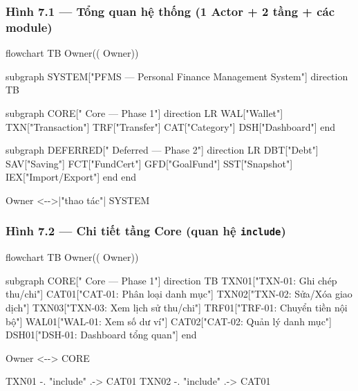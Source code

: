 \documentclass[11pt,a4paper]{article}
\newenvironment{Shaded}{}{}
\newcommand{\NormalTok}[1]{#1}
\begin{document}
\subsubsection{Hình 7.1 --- Tổng quan hệ thống (1 Actor + 2 tầng + các module)}\label{huxecnh-7.1-tux1ed5ng-quan-hux1ec7-thux1ed1ng-1-actor-2-tux1ea7ng-cuxe1c-module}

\begin{Shaded}
\begin{Highlighting}[]
\NormalTok{flowchart TB}
\NormalTok{    Owner(( Owner))}

\NormalTok{    subgraph SYSTEM["PFMS — Personal Finance Management System"]}
\NormalTok{        direction TB}

\NormalTok{        subgraph CORE[" Core — Phase 1"]}
\NormalTok{            direction LR}
\NormalTok{            WAL["Wallet"]}
\NormalTok{            TXN["Transaction"]}
\NormalTok{            TRF["Transfer"]}
\NormalTok{            CAT["Category"]}
\NormalTok{            DSH["Dashboard"]}
\NormalTok{        end}

\NormalTok{        subgraph DEFERRED[" Deferred — Phase 2"]}
\NormalTok{            direction LR}
\NormalTok{            DBT["Debt"]}
\NormalTok{            SAV["Saving"]}
\NormalTok{            FCT["FundCert"]}
\NormalTok{            GFD["GoalFund"]}
\NormalTok{            SST["Snapshot"]}
\NormalTok{            IEX["Import/Export"]}
\NormalTok{        end}
\NormalTok{    end}

\NormalTok{    Owner \textless{}{-}{-}\textgreater{}|"thao tác"| SYSTEM}
\end{Highlighting}
\end{Shaded}

\subsubsection{\texorpdfstring{Hình 7.2 --- Chi tiết tầng Core (quan hệ \texttt{include})}{Hình 7.2 --- Chi tiết tầng Core (quan hệ include)}}\label{huxecnh-7.2-chi-tiux1ebft-tux1ea7ng-core-quan-hux1ec7-include}

\begin{Shaded}
\begin{Highlighting}[]
\NormalTok{flowchart TB}
\NormalTok{    Owner(( Owner))}

\NormalTok{    subgraph CORE[" Core — Phase 1"]}
\NormalTok{        direction TB}
\NormalTok{        TXN01["TXN{-}01: Ghi chép thu/chi"]}
\NormalTok{        CAT01["CAT{-}01: Phân loại danh mục"]}
\NormalTok{        TXN02["TXN{-}02: Sửa/Xóa giao dịch"]}
\NormalTok{        TXN03["TXN{-}03: Xem lịch sử thu/chi"]}
\NormalTok{        TRF01["TRF{-}01: Chuyển tiền nội bộ"]}
\NormalTok{        WAL01["WAL{-}01: Xem số dư ví"]}
\NormalTok{        CAT02["CAT{-}02: Quản lý danh mục"]}
\NormalTok{        DSH01["DSH{-}01: Dashboard tổng quan"]}
\NormalTok{    end}

\NormalTok{    Owner \textless{}{-}{-}\textgreater{} CORE}

\NormalTok{    TXN01 {-}. "include" .{-}\textgreater{} CAT01}
\NormalTok{    TXN02 {-}. "include" .{-}\textgreater{} CAT01}
\end{Highlighting}
\end{Shaded}
\end{document}
